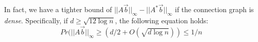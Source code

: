 In fact, we have a tighter bound of $||A\vec{b}||_\infty -||A^*\vec{b}||_\infty$ if 
the connection graph is \emph{dense}. Specifically, if $d\geq \sqrt{12\log n}$, the following
equation holds:
\begin{equation*}
Pr(||A\vec{b}||_\infty \geq (d/2 + O(\sqrt{d\log n})) \leq 1/n
\end{equation*}
